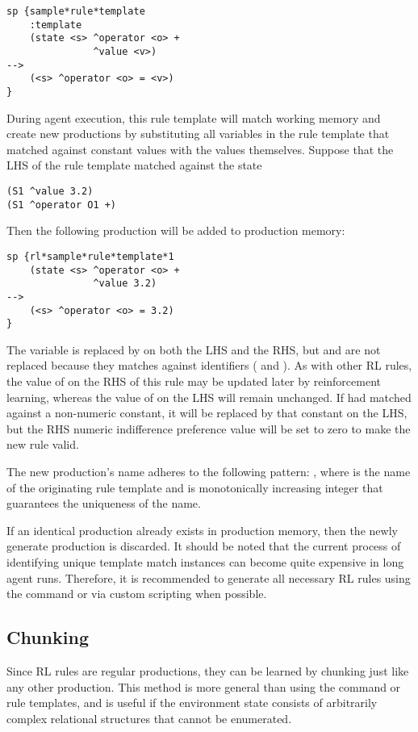 \begin{verbatim}
sp {sample*rule*template
    :template
    (state <s> ^operator <o> +
               ^value <v>)
-->
    (<s> ^operator <o> = <v>)
}
\end{verbatim}

During agent execution, this rule template will match working memory and create new productions by substituting all variables in the rule template that matched against constant values with the values themselves.
Suppose that the LHS of the rule template matched against the state

\begin{verbatim}
(S1 ^value 3.2)
(S1 ^operator O1 +)
\end{verbatim}

Then the following production will be added to production memory:

\begin{verbatim}
sp {rl*sample*rule*template*1
    (state <s> ^operator <o> +
               ^value 3.2)
-->
    (<s> ^operator <o> = 3.2)
}
\end{verbatim}

The variable  is replaced by  on both the LHS and the RHS, but  and  are not replaced because they matches against identifiers ( and ).
As with other RL rules, the value of  on the RHS of this rule may be updated later by reinforcement learning, whereas the value of  on the LHS will remain unchanged.
If  had matched against a non-numeric constant, it will be replaced by that constant on the LHS, but the RHS numeric indifference preference value will be set to zero to make the new rule valid.

The new production's name adheres to the following pattern:
, where  is the name of the originating rule template and  is monotonically increasing integer that guarantees the uniqueness of the name.

If an identical production already exists in production memory, then the newly generate production is discarded.
It should be noted that the current process of identifying unique template match instances can become quite expensive in long agent runs.
Therefore, it is recommended to generate all necessary RL rules using the  command or via custom scripting when possible.

\subsection{Chunking}
Since RL rules are regular productions, they can be learned by chunking just like any other production.
This method is more general than using the  command or rule templates, and is useful if the environment state consists of arbitrarily complex relational structures that cannot be enumerated.
